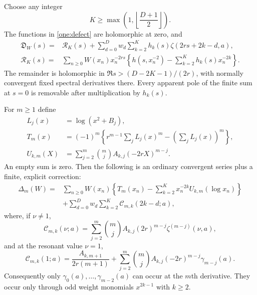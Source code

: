 \begin{theorem}
\label{thm:alljets}
Choose any integer
\begin{equation}\label{one:K}
 K\ge\max\left(1,\left\lfloor\frac{D+1}{2}\right\rfloor\right).
\end{equation}
The functions in \eqref{one:defect} are holomorphic at zero, and
\begin{align}\label{one:master}
 \mathfrak D_W(s)={}&\mathcal R_K(s)
   +\sum_{d=0}^{D}w_d\sum_{k=2}^{K}
                     h_k(s)\zeta(2rs+2k-d,a),\\
 \mathcal R_K(s)={}&\sum_{n\ge0}W(x_n)x_n^{-2rs}
       \left\{h(s,x_n^{-2})-\sum_{k=2}^{K}h_k(s)x_n^{-2k}\right\}.
       \label{one:remainder}
\end{align}
The remainder is holomorphic in
$\Re s>(D-2K-1)/(2r)$, with normally convergent fixed spectral
derivatives there.  Every apparent pole of the finite sum at $s=0$
is removable after multiplication by $h_k(s)$.

For $m\ge1$ define
\begin{align}
 L_j(x)&=\log(x^2+B_j),\\
 T_m(x)&=(-1)^m\left\{r^{m-1}\sum_j L_j(x)^m
                         -\left(\sum_jL_j(x)\right)^m\right\},
                         \label{one:T}\\
 U_{k,m}(X)&=\sum_{j=2}^{m}\binom mj A_{k,j}(-2rX)^{m-j}.
                         \label{one:U}
\end{align}
An empty sum is zero.  Then the following is an ordinary convergent
series plus a finite, explicit correction:
\begin{equation}\label{one:jet}
 \boxed{\begin{aligned}
 \Delta_m(W)={}&\sum_{n\ge0}W(x_n)
       \left\{T_m(x_n)-\sum_{k=2}^{K}x_n^{-2k}
                                      U_{k,m}(\log x_n)\right\}\\
 &+\sum_{d=0}^{D}w_d\sum_{k=2}^{K}\mathcal C_{m,k}(2k-d;a),
 \end{aligned}}
\end{equation}
where, if $\nu\ne1$,
\begin{equation}\label{one:regularC}
 \mathcal C_{m,k}(\nu;a)=
       \sum_{j=2}^{m}\binom mj A_{k,j}(2r)^{m-j}
                                     \zeta^{(m-j)}(\nu,a),
\end{equation}
and at the resonant value $\nu=1$,
\begin{equation}\label{one:resonantC}
 \boxed{\displaystyle
 \mathcal C_{m,k}(1;a)=\frac{A_{k,m+1}}{2r(m+1)}
       +\sum_{j=2}^{m}\binom mj A_{k,j}(-2r)^{m-j}
                                     \gamma_{m-j}(a).}
\end{equation}
Consequently only $\gamma_0(a),\ldots,\gamma_{m-2}(a)$ can occur at
the $m$th derivative.  They occur only through odd weight monomials
$x^{2k-1}$ with $k\ge2$.
\end{theorem}

